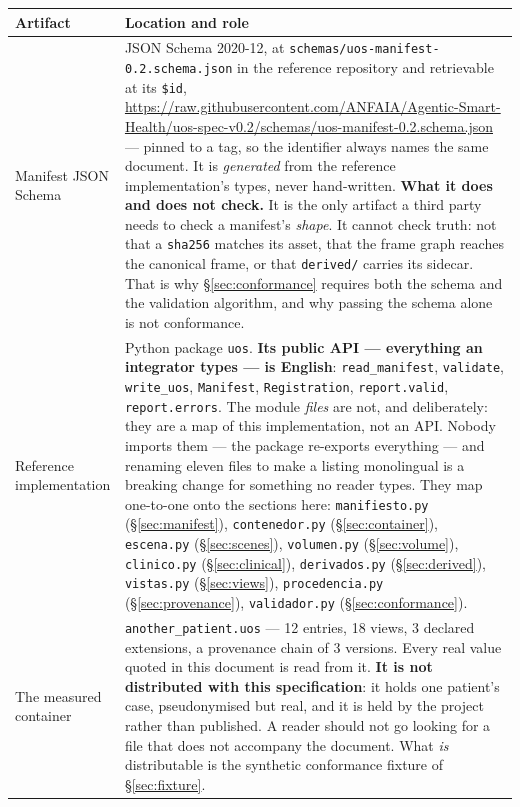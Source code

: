 \documentclass[11pt,a4paper]{article}
\newcommand{\code}[1]{\texttt{\small #1}}
\begin{document}
\begin{longtable}{L{4.6cm} L{10.8cm}}
\toprule
\textbf{Artifact} & \textbf{Location and role}\\
\midrule
\endhead
Manifest JSON Schema & JSON Schema 2020-12, at
\code{schemas/uos-manifest-0.2.schema.json} in the reference repository and retrievable at
its \code{\$id},
\url{https://raw.githubusercontent.com/ANFAIA/Agentic-Smart-Health/uos-spec-v0.2/schemas/uos-manifest-0.2.schema.json}
--- pinned to a tag, so the identifier always names the same document. It is
\emph{generated} from the reference implementation's types, never hand-written. \textbf{What it does and does not check.} It is the only artifact a third party needs
to check a manifest's \emph{shape}. It cannot check truth: not that a \code{sha256} matches
its asset, that the frame graph reaches the canonical frame, or that \code{derived/} carries
its sidecar. That is why \S\ref{sec:conformance} requires both the schema and the validation
algorithm, and why passing the schema alone is not conformance.\\
Reference implementation & Python package \code{uos}. \textbf{Its public API --- everything
an integrator types --- is English}: \code{read\_manifest}, \code{validate},
\code{write\_uos}, \code{Manifest}, \code{Registration}, \code{report.valid},
\code{report.errors}. The module \emph{files} are not, and deliberately: they are a map of
this implementation, not an API. Nobody imports them --- the package re-exports everything
--- and renaming eleven files to make a listing monolingual is a breaking change for
something no reader types. They map one-to-one onto the sections here:
\code{manifiesto.py} (\S\ref{sec:manifest}), \code{contenedor.py}
(\S\ref{sec:container}), \code{escena.py} (\S\ref{sec:scenes}), \code{volumen.py}
(\S\ref{sec:volume}), \code{clinico.py} (\S\ref{sec:clinical}), \code{derivados.py}
(\S\ref{sec:derived}), \code{vistas.py} (\S\ref{sec:views}), \code{procedencia.py}
(\S\ref{sec:provenance}), \code{validador.py} (\S\ref{sec:conformance}).\\
The measured container & \code{another\_patient.uos} --- 12 entries, 18 views, 3 declared
extensions, a provenance chain of 3 versions. Every real value quoted in this document is
read from it. \textbf{It is not distributed with this specification}: it holds one
patient's case, pseudonymised but real, and it is held by the project rather than published.
A reader should not go looking for a file that does not accompany the document. What
\emph{is} distributable is the synthetic conformance fixture of \S\ref{sec:fixture}.\\
\bottomrule
\end{longtable}
\end{document}
